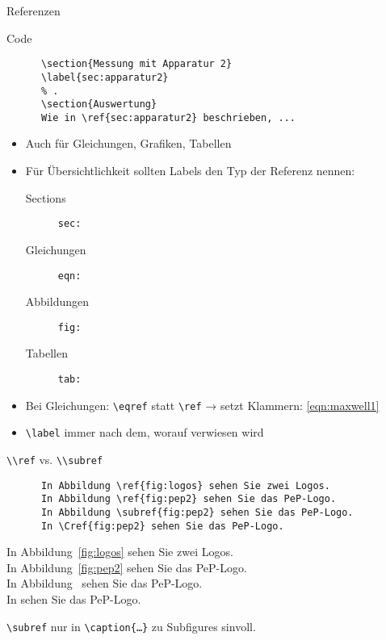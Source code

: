\begin{frame}[fragile]{Referenzen}
  \begin{block}{Code}
    \begin{lstlisting}
      \section{Messung mit Apparatur 2}
      \label{sec:apparatur2}
      % .
      \section{Auswertung}
      Wie in \ref{sec:apparatur2} beschrieben, ...
    \end{lstlisting}
  \end{block}
  \begin{itemize}
    \item Auch für Gleichungen, Grafiken, Tabellen
    \item Für Übersichtlichkeit sollten Labels den Typ der Referenz nennen:
      \begin{description}
        \item[Sections]    \texttt{sec:}
        \item[Gleichungen] \texttt{eqn:}
        \item[Abbildungen] \texttt{fig:}
        \item[Tabellen]    \texttt{tab:}
      \end{description}
    \item Bei Gleichungen: \lstinline+\eqref+ statt \lstinline+\ref+ → setzt Klammern: \eqref{eqn:maxwell1}
    \item \lstinline+\label+ immer nach dem, worauf verwiesen wird
  \end{itemize}
\end{frame}

\begin{frame}[fragile]{\lstinline+\\ref+ vs. \lstinline+\\subref+}
  \begin{CodeExample}{0.47}
    \begin{lstlisting}
      In Abbildung \ref{fig:logos} sehen Sie zwei Logos.
      In Abbildung \ref{fig:pep2} sehen Sie das PeP-Logo.
      In Abbildung \subref{fig:pep2} sehen Sie das PeP-Logo.
      In \Cref{fig:pep2} sehen Sie das PeP-Logo.
    \end{lstlisting}
    \CodeResult
      \strut
      In Abbildung~\ref{fig:logos} sehen Sie zwei Logos. \\[\baselineskip]
      In Abbildung~\ref{fig:pep2} sehen Sie das PeP-Logo. \\[\baselineskip]
      In Abbildung~ sehen Sie das PeP-Logo.\\[\baselineskip]
      In  sehen Sie das PeP-Logo.
  \end{CodeExample}
  \vspace{2em}
  \lstinline+\subref+ nur in \lstinline+\caption{…}+ zu Subfigures sinvoll.
\end{frame}

